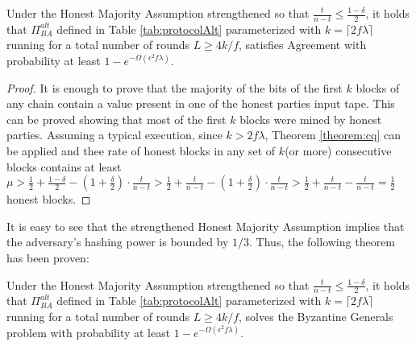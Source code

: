 \documentclass[..]{subfiles}
\begin{document}
\begin{lemma}[Validity]
	Under the Honest Majority Assumption strengthened so that $\frac{t}{n-t} \le \frac{1-\delta}{2}$, it holds that $\Pi_{BA}^{alt}$ defined in Table \ref{tab:protocolAlt} parameterized with $k=\lceil 2f\lambda \rceil$ running for a total number of rounds $L \ge 4k/f$, satisfies Agreement with probability at least $1 - e^{-\Omega(\epsilon^2 f \lambda)}$.
\end{lemma}
\begin{proof}
	It is enough to prove that the majority of the bits of the first $k$ blocks of any chain contain a value present in one of the honest parties input tape. This can be proved showing that most of the first $k$ blocks were mined by honest parties. Assuming a typical execution, since $k > 2f\lambda$, Theorem \ref{theorem:cq} can be applied and thee rate of honest blocks in any set of $k$(or more) consecutive blocks contains at least $\mu > \frac{1}{2} + \frac{1-\delta}{2} - (1+\frac{\delta}{2}) \cdot \frac{t}{n-t} > \frac{1}{2} + \frac{t}{n-t} - (1+\frac{\delta}{2}) \cdot \frac{t}{n-t} > \frac{1}{2} + \frac{t}{n-t} - \frac{t}{n-t} = \frac{1}{2}$ honest blocks.
\end{proof}

It is easy to see that the strengthened Honest Majority Assumption implies that the adversary's hashing power is bounded by $1/3$. Thus, the following theorem has been proven:
\begin{theorem}
	Under the Honest Majority Assumption strengthened so that $\frac{t}{n-t} \le \frac{1-\delta}{2}$, it holds that $\Pi_{BA}^{alt}$ defined in Table \ref{tab:protocolAlt} parameterized with $k=\lceil 2f\lambda \rceil$ running for a total number of rounds $L \ge 4k/f$, solves the Byzantine Generals problem with probability at least $1 - e^{-\Omega(\epsilon^2 f \lambda)}$.
\end{theorem}
\end{document}
